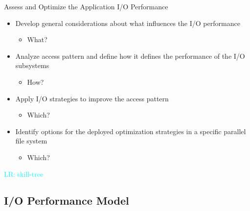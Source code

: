 \documentclass[compress,11pt,xcolor=svgnames,aspectratio=169]{beamer}
\newcommand{\lr}[1]{\textcolor{cyan}{LR: #1}}
\begin{document}
\begin{frame}[t]{Assess and Optimize the Application I/O Performance}

\begin{itemize}
\setlength\itemsep{0.4cm}

    \item Develop general considerations about what influences the I/O performance

    \begin{itemize}
      \item What?
    \end{itemize}

    \item Analyze access pattern and define how it defines the performance of the I/O subsystems

    \begin{itemize}
      \item How?
    \end{itemize}

    \item Apply I/O strategies to improve the access pattern

    \begin{itemize}
      \item Which?
    \end{itemize}

    \item Identify options for the deployed optimization strategies in a specific parallel file system

    \begin{itemize}
      \item Which?
    \end{itemize}

\end{itemize}

\nocite{SOPPOAASLK13} \lr{skill-tree}

\end{frame}

\subsection{I/O Performance Model}
\end{document}
